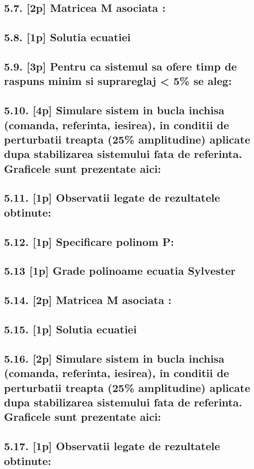 \documentclass[12pt,english]{article}
\begin{document}
\subsection {5.7. [2p]  Matricea M asociata : }
\subsection {5.8. [1p] Solutia ecuatiei}
\subsection {5.9. [3p] Pentru ca sistemul sa ofere timp de raspuns minim si suprareglaj < 5\% se aleg: }
\subsection {5.10. [4p]  Simulare sistem in bucla inchisa (comanda, referinta, iesirea), in conditii de perturbatii treapta (25\% amplitudine) aplicate dupa stabilizarea sistemului fata de referinta. Graficele sunt prezentate aici: }
\subsection {5.11. [1p] Observatii legate de rezultatele obtinute: }
\subsection {5.12. [1p] Specificare polinom P: }
\subsection {5.13 [1p] Grade polinoame ecuatia Sylvester }
\subsection {5.14. [2p]  Matricea M asociata : }
\subsection {5.15. [1p] Solutia ecuatiei}
\subsection {5.16. [2p]  Simulare sistem in bucla inchisa (comanda, referinta, iesirea), in conditii de perturbatii treapta (25\% amplitudine) aplicate dupa stabilizarea sistemului fata de referinta. Graficele sunt prezentate aici: }
\subsection {5.17. [1p] Observatii legate de rezultatele obtinute: }
\end{document}
